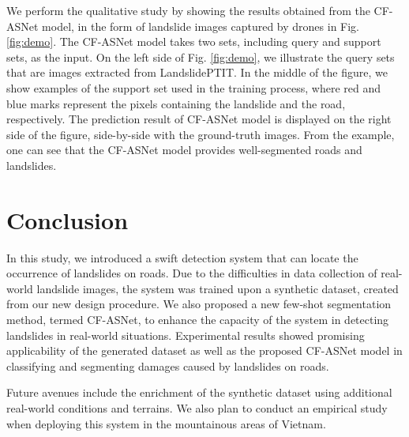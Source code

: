 \documentclass{ieeeaccess}
\begin{document}
We perform the qualitative study by showing the results obtained from the CF-ASNet model, in the form of landslide images captured by drones in Fig. \ref{fig:demo}. The CF-ASNet model takes two sets, including query and support sets, as the input. On the left side of Fig. \ref{fig:demo}, we illustrate the query sets that are images extracted from LandslidePTIT. In the middle of the figure, we show examples of the support set used in the training process, where red and blue marks represent the pixels containing the landslide and the road, respectively. The prediction result of CF-ASNet model is displayed on the right side of the figure, side-by-side with the ground-truth images. From the example, one can see that the CF-ASNet model provides well-segmented roads and landslides. 

\section{Conclusion}

In this study, we introduced a swift detection system that can locate the occurrence of landslides on roads. Due to the difficulties in data collection of real-world landslide images, the system was trained upon a synthetic dataset, created from our new design procedure. We also proposed a new few-shot segmentation method, termed CF-ASNet, to enhance the capacity of the system in detecting landslides in real-world situations. Experimental results showed promising applicability of the generated dataset as well as the proposed CF-ASNet model in classifying and segmenting damages caused by landslides on roads.

Future avenues include the enrichment of the synthetic dataset using additional  real-world conditions and terrains. We also plan to conduct an empirical study when deploying this system in the mountainous areas of Vietnam.



\end{document}
